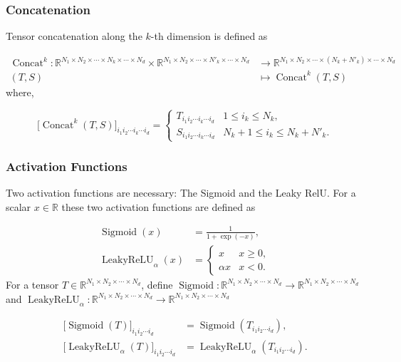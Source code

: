 \documentclass[10pt,a4paper,oneside]{article}
\newcommand{\R}{\mathbb{R}}
\DeclareMathOperator{\concat}{Concat}
\DeclareMathOperator{\sigmoid}{Sigmoid}
\DeclareMathOperator{\LeakyReLU}{LeakyReLU}
\begin{document}
\subsubsection{Concatenation}

Tensor concatenation along the $k$-th dimension is defined as

\begin{align*}
    \concat^k : \mathbb{R}^{N_1 \times N_2 \times \cdots \times N_k \times \cdots \times N_d} \times \mathbb{R}^{N_1 \times N_2 \times \cdots \times N'_k \times \cdots \times N_d} &\rightarrow \R^{N_1 \times N_2 \times \cdots \times (N_k + N'_k) \times \cdots \times N_d}\\
    (T, S) &\mapsto \concat^k(T, S)
\end{align*}
where,

$$
\bigl[\concat^k(T, S)\bigr]_{i_1 i_2  \cdots i_k \cdots i_d} = \begin{cases}
    T_{i_1 i_2 \cdots i_k \cdots i_d} & 1 \leq i_k \leq N_k,\\
    S_{i_1 i_2 \cdots i_k \cdots i_d} & N_k + 1 \leq i_k  \leq N_k + N'_k.
\end{cases}
$$


\subsubsection{Activation Functions}

Two activation functions are necessary: The Sigmoid and the Leaky RelU. For a scalar $x \in \R$ these two activation functions are defined as

\begin{align*}
    \sigmoid(x) &= \frac{1}{1 + \exp(-x)},\\
    \LeakyReLU_{\alpha}(x) &= \begin{cases}
        x & x \geq 0,\\
        \alpha x & x < 0.
    \end{cases}
\end{align*}
For a tensor $T \in \R^{N_1 \times N_2 \times \cdots \times N_d}$, define $\sigmoid: \R^{N_1 \times N_2 \times \cdots \times N_d} \rightarrow \R^{N_1 \times N_2 \times \cdots \times N_d}$  and $\LeakyReLU_{\alpha}: \R^{N_1 \times N_2 \times \cdots \times N_d} \rightarrow \R^{N_1 \times N_2 \times \cdots \times N_d}$

\begin{align*}
    \bigl[\sigmoid(T)\bigr]_{i_1 i_2 \cdots i_d} &= \sigmoid(T_{i_1 i_2 \cdots i_d}),\\
    \bigl[\LeakyReLU_{\alpha}(T)\bigr]_{i_1 i_2 \cdots i_d} &= \LeakyReLU_{\alpha}(T_{i_1 i_2 \cdots i_d}).
\end{align*}
\end{document}
